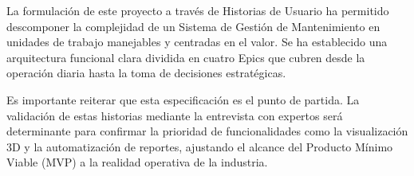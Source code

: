 \documentclass[12pt, a4paper]{article}
\begin{document}
La formulación de este proyecto a través de Historias de Usuario ha permitido descomponer la complejidad de un Sistema de Gestión de Mantenimiento en unidades de trabajo manejables y centradas en el valor. Se ha establecido una arquitectura funcional clara dividida en cuatro Epics que cubren desde la operación diaria hasta la toma de decisiones estratégicas.

Es importante reiterar que esta especificación es el punto de partida. La validación de estas historias mediante la entrevista con expertos será determinante para confirmar la prioridad de funcionalidades como la visualización 3D y la automatización de reportes, ajustando el alcance del Producto Mínimo Viable (MVP) a la realidad operativa de la industria.

\clearpage
\printbibliography[heading=bibintoc,title=Referencias]
\end{document}
